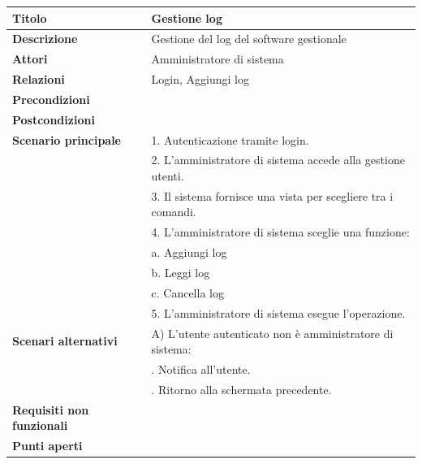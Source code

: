 \documentclass[a4paper]{article}
\begin{document}
\begin{table}[ht!]
  \begin{center}
    \begin{tabulary}{1\textwidth}{l|L}
        \textbf{Titolo} & Gestione log \\
        \hline
        \textbf{Descrizione} & Gestione del log del software gestionale \\
        \hline
        \textbf{Attori} & Amministratore di sistema \\
        \hline
        \textbf{Relazioni} & Login, Aggiungi log \\
        \hline
        \textbf{Precondizioni} &  \\
        \hline
        \textbf{Postcondizioni} &  \\
        \hline
        \textbf{Scenario principale} & 1. Autenticazione tramite login. \\
                                     & 2. L'amministratore di sistema accede alla gestione utenti. \\
                                     & 3. Il sistema fornisce una vista per scegliere tra i comandi. \\
                                     & 4. L'amministratore di sistema sceglie una funzione: \\
                                     & \quad a. Aggiungi log \\
                                     & \quad b. Leggi log \\
                                     & \quad c. Cancella log \\
                                     & 5. L'amministratore di sistema esegue l'operazione.\\
        \hline
        \textbf{Scenari alternativi} & A) L'utente autenticato non è amministratore di sistema: \\
                                     & . Notifica all'utente.\\
                                     & . Ritorno alla schermata precedente.\\
        \hline
        \textbf{Requisiti non funzionali} & \\
        \hline
        \textbf{Punti aperti} & \\
        \hline
    \end{tabulary}
  \end{center}
\end{table}
\end{document}
